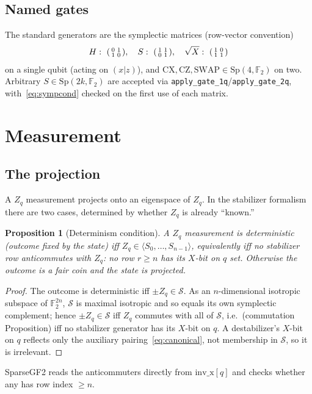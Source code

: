 \documentclass[11pt]{article}
\theoremstyle{definition}
\theoremstyle{plain}
\newtheorem{proposition}[definition]{Proposition}
\newcommand{\F}{\mathbb{F}}
\newcommand{\Sp}{\mathrm{Sp}}
\newcommand{\code}{\textsf{\small SparseGF2}}
\begin{document}
\subsection{Named gates}
The standard generators are the symplectic matrices (row-vector convention)
\[
  H:\ \begin{psmallmatrix}0&1\\1&0\end{psmallmatrix},\quad
  S:\ \begin{psmallmatrix}1&1\\0&1\end{psmallmatrix},\quad
  \sqrt{X}:\ \begin{psmallmatrix}1&0\\1&1\end{psmallmatrix}
\]
on a single qubit (acting on $(x|z)$), and $\mathrm{CX},\mathrm{CZ},
\mathrm{SWAP}\in\Sp(4,\F_2)$ on two. Arbitrary $S\in\Sp(2k,\F_2)$ are accepted
via \texttt{apply\_gate\_1q}/\texttt{apply\_gate\_2q}, with~\eqref{eq:sympcond}
checked on the first use of each matrix.

\section{Measurement}
\label{sec:measure}

\subsection{The projection}
A $Z_q$ measurement projects onto an eigenspace of $Z_q$. In the stabilizer
formalism there are two cases, determined by whether $Z_q$ is already
``known.''
\begin{proposition}[Determinism condition]
\label{prop:det}
A $Z_q$ measurement is \emph{deterministic} (outcome fixed by the state) iff
$Z_q\in\langle S_0,\dots,S_{n-1}\rangle$, equivalently iff
\emph{no stabilizer row anticommutes with $Z_q$}: no row $r\ge n$ has its
$X$-bit on $q$ set. Otherwise the outcome is a fair coin and the state is
projected.
\end{proposition}
\begin{proof}
The outcome is deterministic iff $\pm Z_q\in\mathcal{S}$. As an $n$-dimensional
isotropic subspace of $\F_2^{2n}$, $\mathcal{S}$ is maximal isotropic and so
equals its own symplectic complement; hence $\pm Z_q\in\mathcal{S}$ iff $Z_q$
commutes with all of $\mathcal{S}$, i.e.\ (commutation Proposition) iff no
stabilizer generator has its $X$-bit on $q$. A destabilizer's $X$-bit on $q$
reflects only the auxiliary pairing~\eqref{eq:canonical}, not membership in
$\mathcal{S}$, so it is irrelevant.
\end{proof}
\code{} reads the anticommuters directly from $\mathrm{inv\_x}[q]$ and checks
whether any has row index $\ge n$.
\end{document}
